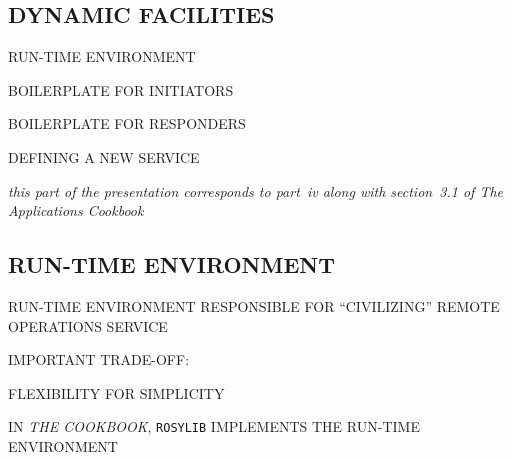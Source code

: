 
\begin{bwslide}
\part	{DYNAMIC FACILITIES}\bf

\begin{nrtc}
\item	RUN-TIME ENVIRONMENT

\item	BOILERPLATE FOR INITIATORS

\item	BOILERPLATE FOR RESPONDERS

\item	DEFINING A NEW SERVICE
\end{nrtc}
\end{bwslide}


\begin{note}\em
this part of the presentation corresponds to part~iv along with section~3.1
of The Applications Cookbook
\end{note}




\begin{bwslide}
\part*	{RUN-TIME ENVIRONMENT}\bf

\begin{nrtc}
\item	RUN-TIME ENVIRONMENT RESPONSIBLE FOR ``CIVILIZING'' REMOTE OPERATIONS
	SERVICE

\item	IMPORTANT TRADE-OFF:
    \begin{nrtc}
    \item	FLEXIBILITY FOR SIMPLICITY
    \end{nrtc}

\item	IN \emph{THE COOKBOOK}, \verb"ROSYLIB" IMPLEMENTS THE RUN-TIME
	ENVIRONMENT
\end{nrtc}
\end{bwslide}


